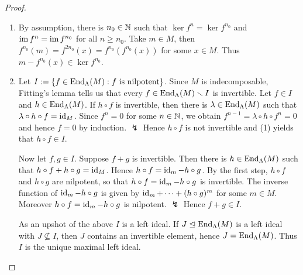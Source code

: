 %




\begin{proof}\
\begin{enumerate}
\item By assumption, there is $n_0\in\mathbb{N}$ such that $\ker f^n=\ker f^{n_0}$ and $\operatorname{im} f^n=\operatorname{im} f^{n_0}$ for all $n\ge n_0$. Take $m\in M$, then $f^{n_0}(m)=f^{2n_0}(x)=f^{n_0}(f^{n_0}(x))$ for some $x\in M$. Thus $m-f^{n_0}(x)\in \ker f^{n_0}$. 
\item Let $I:=\{f\in\operatorname{End}_\Lambda(M): f \text{ is nilpotent}\}$. Since $M$ is indecomposable, Fitting's lemma tells us that every $f\in\operatorname{End}_\Lambda(M)\smallsetminus I$ is invertible. Let $f\in I$ and $h\in \operatorname{End}_\Lambda(M)$. If $h\circ f$ is invertible, then there is $\lambda\in\operatorname{End}_\Lambda(M)$ such that $\lambda \circ h\circ f=\operatorname{id}_M$. Since $f^n=0$ for some $n\in\mathbb{N}$, we obtain $f^{n-1}=\lambda\circ  h\circ  f^n = 0$ and hence $f=0$ by induction. $\lightning$ Hence $h\circ f$ is not invertible and (1) yields that $h\circ f\in I$.

Now let $f,g\in I$. Suppose $f+g$ is invertible. Then there is $h\in\operatorname{End}_\Lambda(M)$ such that $h\circ f+h\circ g=\operatorname{id}_M$. Hence $h\circ f=\operatorname{id}_m-h\circ g$. By the first step, $h\circ f$ and $h\circ g$ are nilpotent, so that $h\circ f=\operatorname{id}_m-h\circ g$ is invertible. The inverse function of $\operatorname{id}_m-h\circ g$ is given by $\operatorname{id}_m+\dots+(h\circ g)^{m}$ for some $m\in M$. Moreover $h\circ f=\operatorname{id}_m-h\circ g$ is nilpotent. $\lightning$ Hence $f+g\in I$.

As an upshot of the above $I$ is a left ideal. If $J\trianglelefteq \operatorname{End}_\Lambda(M)$ is a left ideal with $J\not\subseteq I$, then $J$ contains an invertible element, hence $J=\operatorname{End}_\Lambda(M)$. Thus $I$ is the unique maximal left ideal.\qedhere
\end{enumerate}
\end{proof}


